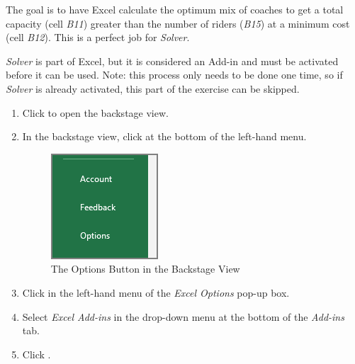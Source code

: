 The goal is to have Excel calculate the optimum mix of coaches to get a total capacity (cell \textit{B11}) greater than the number of riders (\textit{B15}) at a minimum cost (cell \textit{B12}). This is a perfect job for \textit{Solver}.

\textit{Solver} is part of Excel, but it is considered an Add-in and must be activated before it can be used. Note: this process only needs to be done one time, so if \textit{Solver} is already activated, this part of the exercise can be skipped.

\begin{enumbox}
	\begin{enumerate}
		\item Click  to open the backstage view.
		\item In the backstage view, click  at the bottom of the left-hand menu.	
	
		\begin{figure}[H]
			\centering
			\includegraphics[width=\maxwidth{.40\linewidth}]{gfx/ch08_fig70}
			\caption{The Options Button in the Backstage View}
			\label{08:fig70}
		\end{figure}
	
		\item Click  in the left-hand menu of the \textit{Excel Options} pop-up box.
		\item Select \textit{Excel Add-ins} in the drop-down menu at the bottom of the \textit{Add-ins} tab.
		\item Click .
	

\end{enumerate}
\end{enumbox}
